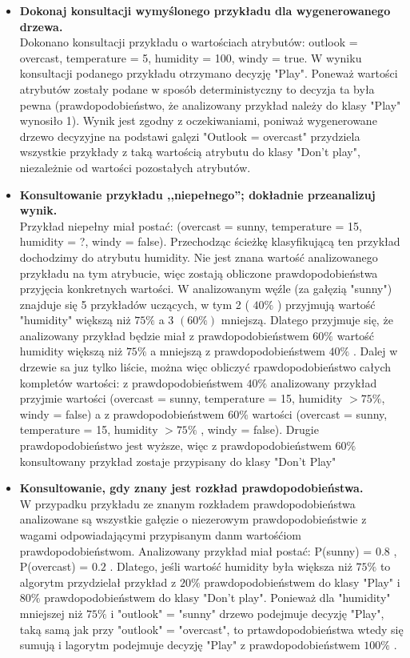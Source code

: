 \begin{itemize}
\item \textbf{Dokonaj konsultacji wymyślonego przykładu dla wygenerowanego drzewa.}
\\Dokonano konsultacji przykładu o wartościach atrybutów: outlook = overcast, temperature = 5, humidity = 100, windy = true. W wyniku konsultacji podanego przykładu otrzymano decyzję "Play". Poneważ wartości atrybutów zostały podane w sposób deterministyczny to decyzja ta była pewna (prawdopodobieństwo, że analizowany przykład należy do klasy "Play" wynosiło 1). Wynik jest zgodny z oczekiwaniami, poniważ wygenerowane drzewo decyzyjne na podstawi galęzi "Outlook = overcast" przydziela wszystkie przykłady z taką wartością atrybutu do klasy "Don't play", niezależnie od wartości pozostałych atrybutów.
	
\item \textbf{Konsultowanie przykładu ,,niepełnego''; dokładnie przeanalizuj wynik.}
\\Przykład niepełny miał postać: (overcast = sunny, temperature = 15, humidity = ?, windy = false). Przechodząc ścieżkę klasyfikującą ten przykład dochodzimy do atrybutu humidity. Nie jest znana wartość analizowanego przykładu na tym atrybucie, więc zostają obliczone prawdopodobieństwa przyjęcia konkretnych wartości. W analizowanym węźle (za gałęzią "sunny") znajduje się 5 przykładów uczących, w tym 2 ( $ 40\% $ ) przyjmują wartość "humidity" większą niż $ 75\% $ a 3  $ ( 60\% ) $ mniejszą. Dlatego przyjmuje się, że analizowany przykład będzie miał z prawdopodobieństwem $ 60\% $ wartość humidity większą niż $ 75\% $ a mniejszą z prawdopodobieństwem $ 40\% $ .	Dalej w drzewie sa juz tylko liście, można więc obliczyć rpawdopodobieństwo całych kompletów wartości: z prawdopodobieństwem $ 40\% $ analizowany przykład przyjmie wartości (overcast = sunny, temperature = 15, humidity  $ > 75\% $, windy = false) a z prawdopodobieństwem $ 60\% $ wartości  (overcast = sunny, temperature = 15, humidity $ >  75\% $ , windy = false). Drugie prawdopodobieństwo jest wyższe, więc z prawdopodobieństwem $ 60\% $ konsultowany przykład zostaje przypisany do klasy "Don't Play"
	
\item \textbf{Konsultowanie, gdy znany jest rozkład prawdopodobieństwa.}
\\W przypadku przykładu ze znanym rozkładem prawdopodobieństwa analizowane są wszystkie gałęzie o niezerowym prawdopodobieństwie z wagami odpowiadającymi przypisanym danm wartośćiom prawdopodobieństwom. Analizowany przykład miał postać: P(sunny) = $ 0.8 $ , P(overcast) = $ 0.2 $ . Dlatego, jeśli wartość humidity była większa niż $ 75\% $ to algorytm przydzielał przykład z $ 20\% $ prawdopodobieństwem do klasy "Play" i $ 80 \% $ prawdopodobieństwem do klasy "Don't play". Ponieważ dla "humidity" mniejszej niż $ 75\% $ i "outlook" = "sunny" drzewo podejmuje decyzję "Play", taką samą jak przy "outlook" = "overcast", to prtawdopodobieństwa wtedy się sumują i lagorytm podejmuje decyzję "Play" z prawdopodobieństwem $ 100 \% $ .

\end{itemize}

